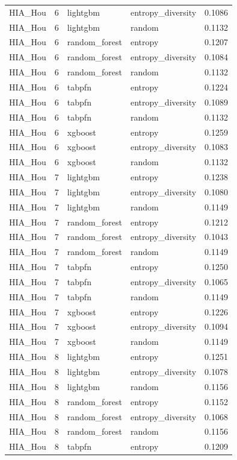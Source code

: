 \begin{tabular}{lrllr}
HIA_Hou & 6 & lightgbm & entropy_diversity & 0.1086 \\
HIA_Hou & 6 & lightgbm & random & 0.1132 \\
HIA_Hou & 6 & random_forest & entropy & 0.1207 \\
HIA_Hou & 6 & random_forest & entropy_diversity & 0.1084 \\
HIA_Hou & 6 & random_forest & random & 0.1132 \\
HIA_Hou & 6 & tabpfn & entropy & 0.1224 \\
HIA_Hou & 6 & tabpfn & entropy_diversity & 0.1089 \\
HIA_Hou & 6 & tabpfn & random & 0.1132 \\
HIA_Hou & 6 & xgboost & entropy & 0.1259 \\
HIA_Hou & 6 & xgboost & entropy_diversity & 0.1083 \\
HIA_Hou & 6 & xgboost & random & 0.1132 \\
HIA_Hou & 7 & lightgbm & entropy & 0.1238 \\
HIA_Hou & 7 & lightgbm & entropy_diversity & 0.1080 \\
HIA_Hou & 7 & lightgbm & random & 0.1149 \\
HIA_Hou & 7 & random_forest & entropy & 0.1212 \\
HIA_Hou & 7 & random_forest & entropy_diversity & 0.1043 \\
HIA_Hou & 7 & random_forest & random & 0.1149 \\
HIA_Hou & 7 & tabpfn & entropy & 0.1250 \\
HIA_Hou & 7 & tabpfn & entropy_diversity & 0.1065 \\
HIA_Hou & 7 & tabpfn & random & 0.1149 \\
HIA_Hou & 7 & xgboost & entropy & 0.1226 \\
HIA_Hou & 7 & xgboost & entropy_diversity & 0.1094 \\
HIA_Hou & 7 & xgboost & random & 0.1149 \\
HIA_Hou & 8 & lightgbm & entropy & 0.1251 \\
HIA_Hou & 8 & lightgbm & entropy_diversity & 0.1078 \\
HIA_Hou & 8 & lightgbm & random & 0.1156 \\
HIA_Hou & 8 & random_forest & entropy & 0.1152 \\
HIA_Hou & 8 & random_forest & entropy_diversity & 0.1068 \\
HIA_Hou & 8 & random_forest & random & 0.1156 \\
HIA_Hou & 8 & tabpfn & entropy & 0.1209 \\

\end{tabular}

